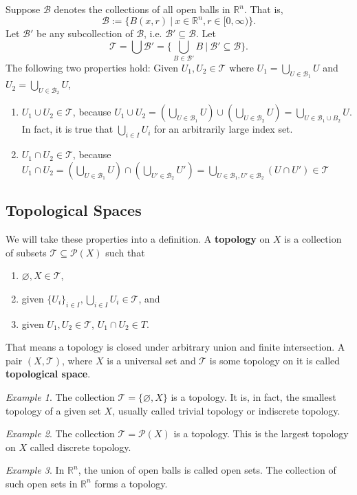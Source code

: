 \documentclass[article,11pt, reqno]{article}
\theoremstyle{remark}
\newtheorem*{example}{Example}
\newcommand{\tb}{\textbf}
\newcommand{\mb}{\mathbb}
\newcommand{\mc}{\mathcal}
\newcommand{\<}{\langle}
\renewcommand{\>}{\rangle}
\begin{document}
Suppose $\mc B$ denotes the collections of all open balls in $\mb R^n$. That is, 
$$\mc B:= \{B(x,r)\ | \ x\in\mb R^n, r\in[0,\infty)\}.$$ Let $\mc B'$ be any subcollection of $\mc B$, i.e. $\mc B'\subseteq\mc B$. Let 
$$\mc T=\bigcup \mc B'=\{\bigcup_{B\in\mc B'} B\ | \ \mc B'\subseteq \mc B\}.$$ The following two properties hold:
Given $U_1, U_2\in\mc T$ where $U_1=\bigcup_{U\in \mc B_1} U$ and $U_2=\bigcup_{U\in \mc B_2} U$, 
\begin{enumerate}
    \item $U_1\cup U_2\in\mc T$, because $U_1\cup U_2=(\bigcup_{U\in \mc B_1} U)\cup (\bigcup_{U\in \mc B_2} U) = \bigcup_{U\in \mc B_1\cup B_2} U$. In fact, it is true that $\bigcup_{i\in I} U_i$ for an arbitrarily large index set.
    \item $U_1\cap U_2\in\mc T$, because $U_1\cap U_2=(\bigcup_{U\in \mc B_1} U)\cap (\bigcup_{U'\in \mc B_2} U') = \bigcup_{U\in\mc B_1, U'\in\mc B_2} (U\cap U')\in\mc T$
\end{enumerate}

\subsection*{Topological Spaces}
We will take these properties into a definition.
A \tb{topology} on $X$ is a collection of subsets $\mc T\subseteq \mc P(X)$ such that
\begin{enumerate}
    \item $\varnothing, X\in\mc T$,
    \item given $\{U_i\}_{i\in I}, \bigcup_{i\in I} U_i\in\mc T$, and
    \item given $U_1, U_2\in\mc T$, $U_1\cap U_2\in T$.
\end{enumerate}
That means a topology is closed under arbitrary union and finite intersection. A pair $(X, \mc T)$, where $X$ is a universal set and $\mc T$ is some topology on it is called \tb{topological space}.
\begin{example}
    The collection $\mc T=\{\varnothing, X\}$ is a topology. It is, in fact, the smallest topology of a given set $X$, usually called trivial topology or indiscrete topology.
\end{example}
\begin{example}
    The collection $\mc T=\mc P(X)$ is a topology. This is the largest topology on $X$ called discrete topology.
\end{example}
\begin{example}
    In $\mb R^n$, the union of open balls is called open sets. The collection of such open sets in $\mb R^n$ forms a topology.
\end{example}
\end{document}
